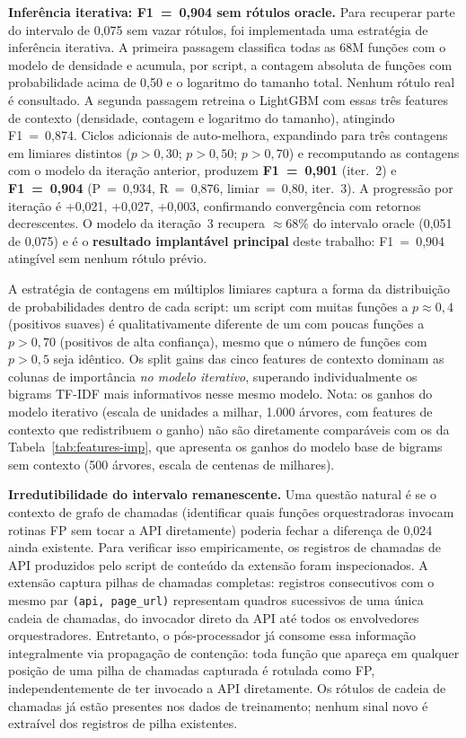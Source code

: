 \textbf{Inferência iterativa: F1~=~0,904 sem rótulos oracle.} Para recuperar parte
do intervalo de 0,075 sem vazar rótulos, foi implementada uma estratégia de
inferência iterativa. A primeira passagem classifica todas as 68M funções com o
modelo de densidade e acumula, por script, a contagem absoluta de funções com
probabilidade acima de 0,50 e o logaritmo do tamanho total.
Nenhum rótulo real é consultado. A segunda passagem retreina o LightGBM com essas
três features de contexto (densidade, contagem e logaritmo do tamanho), atingindo
F1~=~0,874. Ciclos adicionais de auto-melhora, expandindo para três contagens em
limiares distintos ($p{>}0{,}30$; $p{>}0{,}50$; $p{>}0{,}70$) e recomputando as
contagens com o modelo da iteração anterior, produzem \textbf{F1~=~0,901} (iter.~2)
e \textbf{F1~=~0,904} (P~=~0,934, R~=~0,876, limiar~=~0,80, iter.~3). A progressão
por iteração é +0,021, +0,027, +0,003, confirmando convergência com retornos
decrescentes. O modelo da
iteração~3 recupera $\approx$68\% do intervalo oracle (0,051 de 0,075) e é o
\textbf{resultado implantável principal} deste trabalho: F1~=~0,904 atingível
sem nenhum rótulo prévio.

A estratégia de contagens em múltiplos limiares captura a forma da
distribuição de probabilidades dentro de cada script: um script com muitas funções
a $p \approx 0{,}4$ (positivos suaves) é qualitativamente diferente de um com
poucas funções a $p{>}0{,}70$ (positivos de alta confiança), mesmo que o número de
funções com $p{>}0{,}5$ seja idêntico. Os split gains das cinco features de
contexto dominam as colunas de importância \emph{no modelo iterativo}, superando
individualmente os bigrams TF-IDF mais informativos nesse mesmo modelo. Nota: os
ganhos do modelo iterativo (escala de unidades a milhar, 1.000 árvores, com
features de contexto que redistribuem o ganho) não são diretamente comparáveis
com os da Tabela~\ref{tab:features-imp}, que apresenta os ganhos do modelo base
de bigrams sem contexto (500 árvores, escala de centenas de milhares).

\textbf{Irredutibilidade do intervalo remanescente.} Uma questão natural é se o
contexto de grafo de chamadas (identificar quais funções orquestradoras invocam
rotinas FP sem tocar a API diretamente) poderia fechar a diferença de 0,024
ainda existente. Para verificar isso empiricamente, os registros de chamadas de API produzidos
pelo script de conteúdo da extensão foram inspecionados. A extensão captura
pilhas de chamadas completas: registros consecutivos com o mesmo par
\texttt{(api, page\_url)} representam quadros sucessivos de uma única cadeia de
chamadas, do invocador direto da API até todos os envolvedores orquestradores.
Entretanto, o pós-processador já consome essa informação integralmente via
propagação de contenção: toda função que apareça em qualquer posição de uma
pilha de chamadas capturada é rotulada como FP, independentemente de ter invocado
a API diretamente. Os rótulos de cadeia de chamadas já estão presentes nos dados de
treinamento; nenhum sinal novo é extraível dos registros de pilha existentes.

